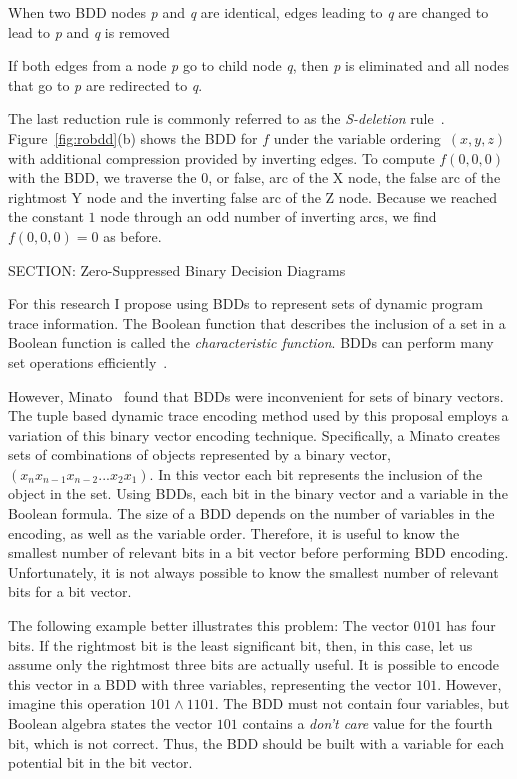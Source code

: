 { When two BDD nodes \textit{p} and \textit{q} are identical, edges
 leading to \textit{q} are changed to lead to \textit{p} and \textit{q} is removed

 If both edges from a node \textit{p} go to
 child node \textit {q}, then \textit{p} is eliminated and all nodes that go to \textit{p} are redirected to \textit{q}.

The last reduction rule is commonly referred to as the \emph{S-deletion} rule~\cite{minato:01:STTT}. Figure~\ref{fig:robdd}(b) shows the BDD for $f$ under the variable ordering~$(x,y,z)$ with additional compression provided by inverting edges. To compute $f(0,0,0)$ with the BDD, we traverse the $0$, or false, arc of the X node, the false arc of the rightmost Y node and the inverting false arc of the Z node. Because we reached the constant $1$ node through an odd number of inverting arcs, we find $f(0,0,0)=0$ as before.

SECTION: Zero-Suppressed Binary Decision Diagrams


For this research I propose using BDDs to represent sets of dynamic program trace information.  The Boolean function that describes the inclusion of a set in a Boolean function is called the \textit{characteristic function}. BDDs can perform many set operations efficiently~\cite{bryant:86:ieeetc}.

However, Minato~\cite{minato:93:dac} found that BDDs were inconvenient for sets of binary vectors.  The tuple based dynamic trace encoding method used by this proposal employs a variation of this binary vector encoding technique.  Specifically, a Minato creates sets of combinations of objects represented by a binary vector, $(x_{n}x_{n-1}x_{n-2}...x_{2}x_{1})$.  In this vector each bit represents the inclusion of the object in the set.  Using BDDs, each bit in the binary vector and a variable in the Boolean formula.  The size of a BDD depends on the number of variables in the encoding, as well as the variable order.  Therefore, it is useful to know the smallest number of relevant bits in a bit vector before performing BDD encoding.  Unfortunately, it is not always possible to know the smallest number of relevant bits for a bit vector.

The following example better illustrates this problem: The vector ${0101}$ has four bits.  If the rightmost bit is the least significant bit, then, in this case, let us assume only the rightmost three bits are actually useful.  It is possible to encode this vector in a BDD with three variables, representing the vector ${101}$.  However, imagine this operation ${101} \wedge {1101}$. The BDD must not contain four variables, but Boolean algebra states the vector ${101}$ contains a \textit{don't care} value for the fourth bit, which is not correct.  Thus, the BDD should be built with a variable for each potential bit in the bit vector.

}
